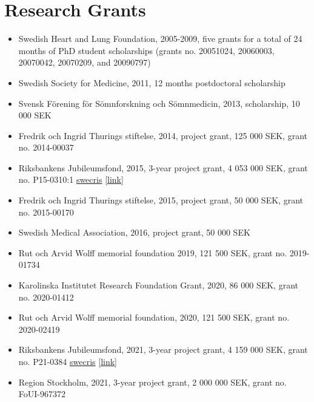 \documentclass[10pt,a4paper,twocolumn]{article}
\begin{document}
\section{Research Grants}
\begin{itemize}

    \item Swedish Heart and Lung Foundation, 2005-2009, five grants for a total of 24 months of PhD student scholarships (grants no. 20051024, 20060003, 20070042, 20070209, and 20090797)

    \item Swedish Society for Medicine, 2011, 12 months postdoctoral scholarship

    \item Svensk Förening för Sömnforskning och Sömnmedicin, 2013, scholarship, 10 000 SEK

    \item Fredrik och Ingrid Thurings stiftelse, 2014, project grant, 125 000 SEK, grant no. 2014-00037

    \item Riksbankens Jubileumsfond, 2015, 3-year project grant, 4 053 000 SEK, grant no. P15-0310:1 \href{https://swecris}{swecris} \href{https://www.vr.se/english/swecris.html#/project/P15-0310:1_RJ}{[link]}

    \item Fredrik och Ingrid Thurings stiftelse, 2015, project grant, 50 000 SEK, grant no. 2015-00170

    \item Swedish Medical Association, 2016, project grant, 50 000 SEK

    \item Rut och Arvid Wolff memorial foundation 2019, 121 500 SEK, grant no. 2019-01734

    \item Karolinska Institutet Research Foundation Grant, 2020, 86 000 SEK, grant no. 2020-01412

    \item Rut och Arvid Wolff memorial foundation, 2020, 121 500 SEK, grant no. 2020-02419

    \item Riksbankens Jubileumsfond, 2021, 3-year project grant, 4 159 000 SEK, grant no. P21-0384 \href{https://swecris}{swecris} \href{https://www.vr.se/english/swecris.html#/project/P21-0384_RJ}{[link]}

    \item Region Stockholm, 2021, 3-year project grant, 2 000 000 SEK, grant no. FoUI-967372


\end{itemize}
\end{document}
